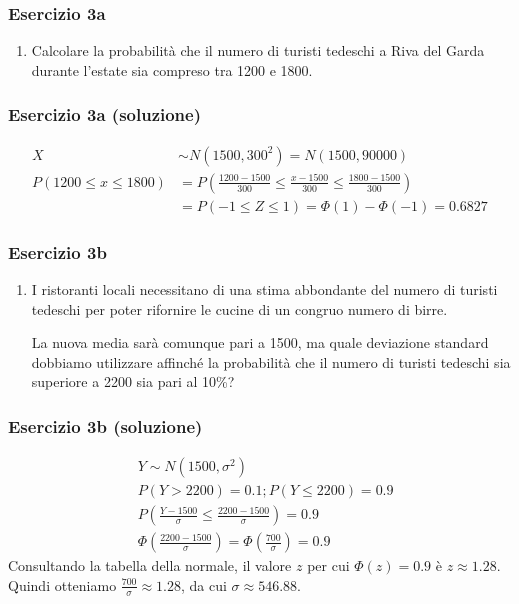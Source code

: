 \documentclass{beamer}
\begin{document}
\begin{frame}[fragile]
	\frametitle{Esercizio 3a}

	\begin{enumerate}[a]
		\item Calcolare la probabilità che il numero di turisti tedeschi a Riva del Garda durante l'estate sia compreso tra 1200 e 1800.
	\end{enumerate}

\end{frame}
\begin{frame}[fragile]
	\frametitle{Esercizio 3a (soluzione)}
	\begin{align*}
		X & \sim N(1500, 300^2) = N(1500, 90000) \\
		P (1200 \le x \le 1800) & = P(\frac{1200 - 1500}{300} \le \frac{x - 1500}{300} \le \frac{1800 - 1500}{300})  \\ & = P(-1 \le Z \le 1) = \Phi(1) - \Phi(-1) = 0.6827
	\end{align*}
\end{frame}

\begin{frame}[fragile]
	\frametitle{Esercizio 3b}
	\begin{enumerate}[b]
		\item I ristoranti locali necessitano di una stima abbondante del numero di turisti tedeschi per poter rifornire le cucine di un congruo numero di birre.
		
		La nuova media sarà comunque pari a 1500, ma quale deviazione standard dobbiamo utilizzare affinché la probabilità che il numero di turisti tedeschi sia superiore a 2200 sia pari al 10\%?
	\end{enumerate}
\end{frame}


\begin{frame}[fragile]
	\frametitle{Esercizio 3b (soluzione)}

	\begin{align*}
		& Y  \sim N(1500, \sigma^2) \\
		& P(Y > 2200) = 0.1 ; P(Y \le 2200) = 0.9 \\
		& P(\frac{Y - 1500}{\sigma} \le \frac{2200 - 1500}{\sigma}) = 0.9 \\
		& \Phi(\frac{2200 - 1500}{\sigma}) = \Phi(\frac{700}{\sigma}) = 0.9
	\end{align*}
	Consultando la tabella della normale, il valore $z$ per cui $\Phi(z) = 0.9$ è $z \approx 1.28$. Quindi otteniamo $\frac{700}{\sigma} \approx 1.28$, da cui $\sigma \approx 546.88$.

\end{frame}
\end{document}
